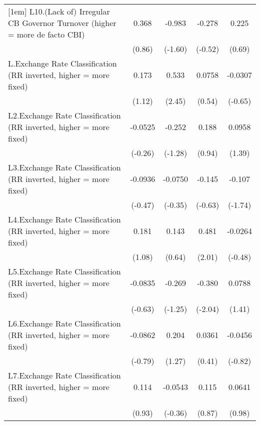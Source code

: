 {\begin{longtable}{l*{4}{c}}
[1em]
L10.(Lack of) Irregular CB Governor Turnover (higher = more de facto CBI)&    0.368         &   -0.983         &   -0.278         &    0.225         \\
                &   (0.86)         &  (-1.60)         &  (-0.52)         &   (0.69)         \\
[1em]
L.Exchange Rate Classification (RR inverted, higher = more fixed)&    0.173         &    0.533\sym{*}  &   0.0758         &  -0.0307         \\
                &   (1.12)         &   (2.45)         &   (0.54)         &  (-0.65)         \\
[1em]
L2.Exchange Rate Classification (RR inverted, higher = more fixed)&  -0.0525         &   -0.252         &    0.188         &   0.0958         \\
                &  (-0.26)         &  (-1.28)         &   (0.94)         &   (1.39)         \\
[1em]
L3.Exchange Rate Classification (RR inverted, higher = more fixed)&  -0.0936         &  -0.0750         &   -0.145         &   -0.107         \\
                &  (-0.47)         &  (-0.35)         &  (-0.63)         &  (-1.74)         \\
[1em]
L4.Exchange Rate Classification (RR inverted, higher = more fixed)&    0.181         &    0.143         &    0.481\sym{*}  &  -0.0264         \\
                &   (1.08)         &   (0.64)         &   (2.01)         &  (-0.48)         \\
[1em]
L5.Exchange Rate Classification (RR inverted, higher = more fixed)&  -0.0835         &   -0.269         &   -0.380\sym{*}  &   0.0788         \\
                &  (-0.63)         &  (-1.25)         &  (-2.04)         &   (1.41)         \\
[1em]
L6.Exchange Rate Classification (RR inverted, higher = more fixed)&  -0.0862         &    0.204         &   0.0361         &  -0.0456         \\
                &  (-0.79)         &   (1.27)         &   (0.41)         &  (-0.82)         \\
[1em]
L7.Exchange Rate Classification (RR inverted, higher = more fixed)&    0.114         &  -0.0543         &    0.115         &   0.0641         \\
                &   (0.93)         &  (-0.36)         &   (0.87)         &   (0.98)         \\

\end{longtable}}
